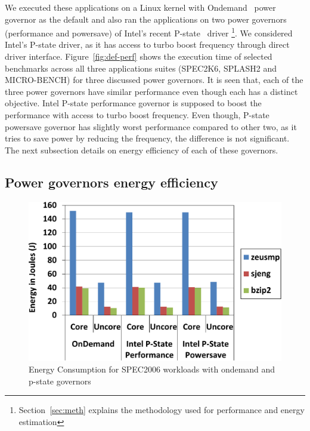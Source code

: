 We executed these applications on a Linux kernel with Ondemand~\cite{ondemand2006} power governor
as the default and also ran the applications on two power governors (performance and powersave) 
of Intel's recent P-state~\cite{pstate, rotem2012power} driver \footnote{
Section~\ref{sec:meth} explains the methodology used for performance and energy estimation}. 
We considered Intel's P-state driver, as it has access to turbo boost frequency 
through direct driver interface. Figure~\ref{fig:def-perf} shows the execution time 
of selected benchmarks across all three applications suites (SPEC2K6, SPLASH2 and MICRO-BENCH) for
three discussed power governors. It is seen that, each of the three power governors 
have similar performance even though each has a distinct objective.
Intel P-state performance governor is supposed to boost the performance
with access to turbo boost frequency. Even though, P-state powersave governor 
has slightly worst performance compared to other two, as it tries
to save power by reducing the frequency, the difference is not significant.
The next subsection details on energy efficiency of each of these governors. 

\subsection{Power governors energy efficiency}
\begin{figure}[h]
  \begin{center}
\includegraphics[width=\linewidth]{figs/def-drivers-spec-crop.pdf}
  \end{center}
  \vspace{-0.1in}
  \caption{Energy Consumption for SPEC2006 workloads with ondemand and p-state governors}
  \label{fig:spec-energy}
\end{figure}

